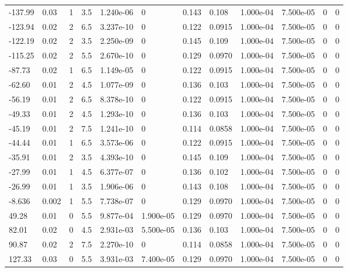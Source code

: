\documentclass[preview]{standalone}
\begin{document}
{{\begin{tabular}{L{1.2cm}C{1.2cm} C{0.3cm}C{0.5cm} C{1.4cm}C{1.4cm} C{1.4cm}C{1.4cm} C{1.6cm}C{1.6cm} C{1.6cm}C{1.6cm}}
  -137.99  &  0.03  & 1     & 3.5 &  1.240e-06  & 0  &  0.143&   0.108& 1.000e-04 & 7.500e-05   &  0 & 0  \\ 
  -123.94  &  0.02  & 2     & 6.5 &  3.237e-10  & 0  &  0.122&   0.0915& 1.000e-04 & 7.500e-05   &  0 & 0  \\ 
  -122.19  &  0.02  & 2     & 3.5 &  2.250e-09  & 0  &  0.145&   0.109& 1.000e-04 & 7.500e-05   &  0 & 0  \\ 
  -115.25  &  0.02  & 2     & 5.5 &  2.670e-10  & 0  &  0.129&   0.0970& 1.000e-04 & 7.500e-05   &  0 & 0  \\ 
  -87.73  &  0.02  & 1     & 6.5 &  1.149e-05  & 0  &  0.122&   0.0915& 1.000e-04 & 7.500e-05   &  0 & 0  \\ 
  -62.60  &  0.01  & 2     & 4.5 &  1.077e-09  & 0  &  0.136&   0.103& 1.000e-04 & 7.500e-05   &  0 & 0  \\ 
  -56.19  &  0.01  & 2     & 6.5 &  8.378e-10  & 0  &  0.122&   0.0915& 1.000e-04 & 7.500e-05   &  0 & 0  \\ 
  -49.33  &  0.01  & 2     & 4.5 &  1.293e-10  & 0  &  0.136&   0.103& 1.000e-04 & 7.500e-05   &  0 & 0  \\ 
  -45.19  &  0.01  & 2     & 7.5 &  1.241e-10  & 0  &  0.114&   0.0858& 1.000e-04 & 7.500e-05   &  0 & 0  \\ 
  -44.44  &  0.01  & 1     & 6.5 &  3.573e-06  & 0  &  0.122&   0.0915& 1.000e-04 & 7.500e-05   &  0 & 0  \\ 
  -35.91  &  0.01  & 2     & 3.5 &  4.393e-10  & 0  &  0.145&   0.109& 1.000e-04 & 7.500e-05   &  0 & 0  \\ 
  -27.99  &  0.01  & 1     & 4.5 &  6.377e-07  & 0  &  0.136&   0.102& 1.000e-04 & 7.500e-05   &  0 & 0  \\ 
  -26.99  &  0.01  & 1     & 3.5 &  1.906e-06  & 0  &  0.143&   0.108& 1.000e-04 & 7.500e-05   &  0 & 0  \\ 
  -8.636  &  0.002  & 1     & 5.5 &  7.738e-07  & 0  &  0.129&   0.0970& 1.000e-04 & 7.500e-05   &  0 & 0  \\ 
  49.28  &  0.01  & 0     & 5.5 &  9.877e-04  & 1.900e-05  &  0.129&   0.0970& 1.000e-04 & 7.500e-05   &  0 & 0  \\ 
  82.01  &  0.02  & 0     & 4.5 &  2.931e-03  & 5.500e-05  &  0.136&   0.103& 1.000e-04 & 7.500e-05   &  0 & 0  \\ 
  90.87  &  0.02  & 2     & 7.5 &  2.270e-10  & 0  &  0.114&   0.0858& 1.000e-04 & 7.500e-05   &  0 & 0  \\ 
  127.33  &  0.03  & 0     & 5.5 &  3.931e-03  & 7.400e-05  &  0.129&   0.0970& 1.000e-04 & 7.500e-05   &  0 & 0  \\ 

\end{tabular}}}
\end{document}
